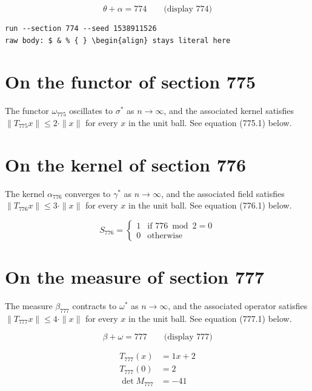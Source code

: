 \documentclass{article}
\begin{document}
$$
\theta + \alpha = 774 \qquad \text{(display 774)}
$$

\begin{verbatim}
run --section 774 --seed 1538911526
raw body: $ & % { } \begin{align} stays literal here
\end{verbatim}

\section{On the functor of section 775}
The functor $\omega_{775}$ oscillates to $\sigma^{*}$ as $n \to \infty$,
and the associated kernel satisfies $\|T_{775} x\| \leq 2 \cdot \|x\|$
for every $x$ in the unit ball. See equation (775.1) below.

\section{On the kernel of section 776}
The kernel $\alpha_{776}$ converges to $\gamma^{*}$ as $n \to \infty$,
and the associated field satisfies $\|T_{776} x\| \leq 3 \cdot \|x\|$
for every $x$ in the unit ball. See equation (776.1) below.

\begin{equation}
S_{776} = \begin{cases} 1 & \text{if } 776 \bmod 2 = 0 \\ 0 & \text{otherwise} \end{cases}
\end{equation}

\section{On the measure of section 777}
The measure $\beta_{777}$ contracts to $\omega^{*}$ as $n \to \infty$,
and the associated operator satisfies $\|T_{777} x\| \leq 4 \cdot \|x\|$
for every $x$ in the unit ball. See equation (777.1) below.

$$
\beta + \omega = 777 \qquad \text{(display 777)}
$$

\begin{align}
T_{777}(x) &= 1 x + 2 \\
T_{777}(0) &= 2 \\
\det M_{777} &= -41
\end{align}
\end{document}
